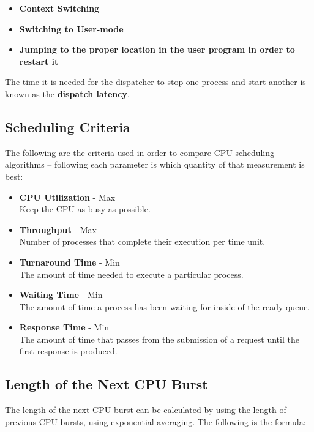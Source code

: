 \documentclass{article}
\begin{document}
\begin{itemize}
	\item \textbf{Context Switching}
	\item \textbf{Switching to User-mode}
	\item \textbf{Jumping to the proper location in the user program in order to restart it}
\end{itemize}
The time it is needed for the dispatcher to stop one process and start another is known as the \textbf{dispatch latency}.

\subsection{Scheduling Criteria}
The following are the criteria used in order to compare CPU-scheduling algorithms -- following each parameter is which quantity of that measurement is best:

\begin{itemize}
	\item \textbf{CPU Utilization} - Max
	\vspace{.2cm} \\
	Keep the CPU as busy as possible.
	
	\item \textbf{Throughput} - Max
	\vspace{.2cm} \\
	Number of processes that complete their execution per time unit.
	
	\item \textbf{Turnaround Time} - Min
	\vspace{.2cm} \\
	The amount of time needed to execute a particular process.
	
	\item \textbf{Waiting Time} - Min
	\vspace{.2cm} \\
	The amount of time a process has been waiting for inside of the ready queue.
	
	\item \textbf{Response Time} - Min
	\vspace{.2cm} \\
	The amount of time that passes from the submission of a request until the first response is produced.
\end{itemize}

\subsection{Length of the Next CPU Burst}
The length of the next CPU burst can be calculated by using the length of previous CPU bursts, using exponential averaging. The following is the formula: \
\end{document}
